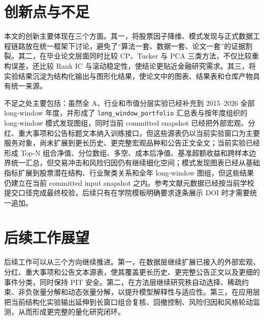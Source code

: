 \section{创新点与不足}

本文的创新主要体现在三个方面。其一，将股票因子降维、模式发现与正式数据工程链路放在统一框架下讨论，避免了“算法一套、数据一套、论文一套”的证据割裂。其二，在毕业论文层面同时比较 CP、Tucker 与 PCA 三类方法，不仅比较重构误差，还比较 Rank IC 与滚动稳定性，使结论更贴近金融研究需求。其三，将实验结果沉淀为结构化输出与图形化结果，使论文中的图表、结果表和仓库产物具有统一来源。

不足之处主要包括：虽然全 A、行业和市值分层实验已经补充到 2015--2026 全部 long-window 年度，并形成了 \texttt{long\_window\_portfolio} 汇总表与按年度组织的 long-window 模式发现图组，同时当前 committed snapshot 已经把外部宏观、分红、重大事项和公告标题文本纳入训练接口，但这些源表仍以当前实验窗口为主要服务对象，尚未扩展到更长历史、更完整宏观品种和公告正文全文；当前实验已经形成 Top-N 组合净值、分位数组、多空、成本后净值、基准超额收益和跨样本边界统一汇总，但交易冲击和风险归因仍有继续细化空间；模式发现图表已经从基础指标扩展到股票潜在结构、行业聚类关系和全年 long-window 图组，但这些结果仍建立在当前 committed input snapshot 之内。参考文献元数据已经按当前学校提交口径完成最终校验，后续只有在学院模板明确要求逐条展示 DOI 时才需要统一追加。

\section{后续工作展望}

后续工作可以从三个方向继续推进。第一，在数据层继续扩展已接入的外部宏观、分红、重大事项和公告文本源表，使其覆盖更长历史、更完整公告正文以及更细的事件分类，同时保持 PIT 安全。第二，在方法层继续研究秩自动选择、稀疏约束、非负张量分解和动态张量分解，以提升模型解释性与适应性。第三，在应用层把当前结构化实验输出延伸到长窗口组合复核、回撤控制、风险归因和风格轮动监测，从而形成更完整的量化研究闭环。

